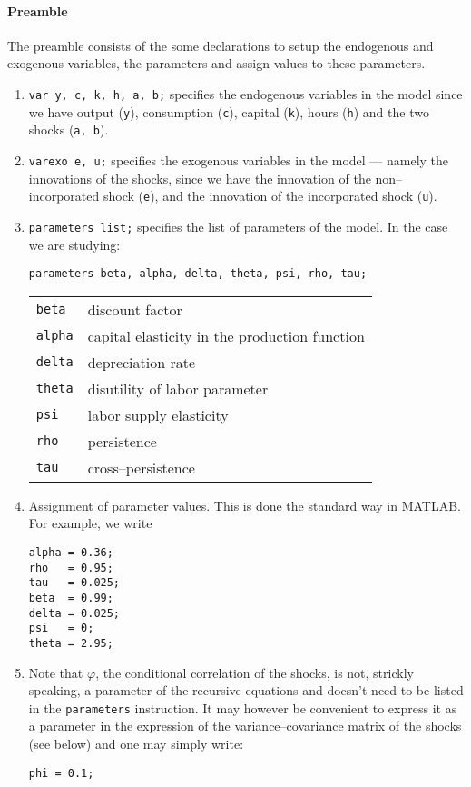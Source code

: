 \documentclass[11pt,a4paper]{article}
\begin{document}
\paragraph{Preamble}
The preamble consists of the some declarations to setup the endogenous and exogenous variables, the parameters and assign values to these parameters. 
\begin{enumerate}
\item {\tt var y, c, k, h, a, b;} specifies the endogenous variables in the model since we have output ({\tt y}), consumption ({\tt c}), capital ({\tt k}), hours ({\tt h}) and the two shocks ({\tt a, b}).
\item {\tt varexo e, u;} specifies the exogenous variables in the model --- namely the innovations of the shocks, since we have the innovation of the non--incorporated shock ({\tt e}), and the innovation of the incorporated shock ({\tt u}).
\item {\tt parameters list;} specifies the list of parameters of the model. In the case we are studying:

{\tt parameters beta, alpha, delta, theta, psi, rho, tau;}

\begin{tabular}{ll}
\hline
\hline
{\tt beta}  & discount factor                               \\
{\tt alpha} & capital elasticity in the production function \\
{\tt delta} & depreciation rate                             \\
{\tt theta} & disutility of labor parameter                 \\
{\tt psi}   & labor supply elasticity                       \\
{\tt rho}   & persistence                                   \\
{\tt tau}   & cross--persistence                            \\
\hline
\hline
\end{tabular}
\item Assignment of parameter values. This is done the standard way in MATLAB. For example, we write

\begin{verbatim}
alpha = 0.36;
rho   = 0.95;
tau   = 0.025;
beta  = 0.99;
delta = 0.025;
psi   = 0;
theta = 2.95;
\end{verbatim}


\item Note that $\varphi$, the conditional correlation of the shocks, is not, strickly speaking, a parameter of the recursive equations and doesn't need to be listed in the {\tt parameters} instruction. It may however be convenient to express it as a parameter in the expression of the variance--covariance matrix of the shocks (see below) and one may simply write:

{\tt phi = 0.1; }

\end{enumerate}
\end{document}
